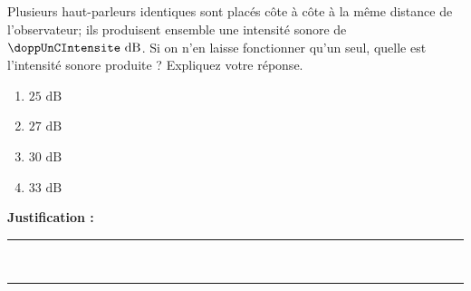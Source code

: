 \subsection{}
Plusieurs haut-parleurs identiques sont placés côte à côte à la même distance de l’observateur; ils produisent ensemble une intensité sonore de $\doppUnCIntensite \text{ dB}$. Si on n'en laisse fonctionner qu'un seul, quelle est l’intensité sonore produite ? Expliquez votre réponse.

\begin{enumerate}[label=\Alph*)]
    \item $25\text{ dB}$
    \item $27\text{ dB}$
    \item $30\text{ dB}$
    \item $33\text{ dB}$
\end{enumerate}

\noindent\textbf{Justification :} \hrulefill \\[2.5ex]
\rule{\linewidth}{0.4pt} \\[2.5ex]
\rule{\linewidth}{0.4pt}
\vfill